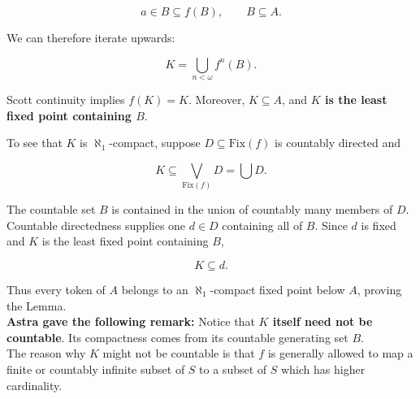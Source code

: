 \documentclass{article}
\begin{document}
$$
a\in B\subseteq f(B),\qquad B\subseteq A.
$$

We can therefore iterate upwards:

$$
K=\bigcup_{n<\omega}f^n(B).
$$

Scott continuity implies $f(K)=K$. Moreover, $K\subseteq A$, and {\bf $K$ is the least fixed point containing $B$}.

To see that $K$ is $\aleph_1$-compact, suppose $D\subseteq \mathrm{Fix}(f)$ is countably directed and

$$
K\subseteq\bigvee_{\mathrm{Fix}(f)}D=\bigcup D.
$$

The countable set $B$ is contained in the union of countably many members of $D$. Countable directedness supplies one $d\in D$ containing all of $B$. Since $d$ is fixed and  $K$ is the least fixed point containing $B$,

$$
K\subseteq d.
$$

Thus every token of $A$ belongs to an $\aleph_1$-compact fixed point below $A$, proving the Lemma.\\

{\bf Astra gave the following remark:} Notice that {\bf $K$ itself need not be countable}. Its compactness comes from its countable generating set $B$.\\

The reason why $K$ might not be countable is that $f$ is generally allowed to map a finite or countably infinite subset of $S$ to a subset of $S$ which has higher cardinality.
\end{document}
